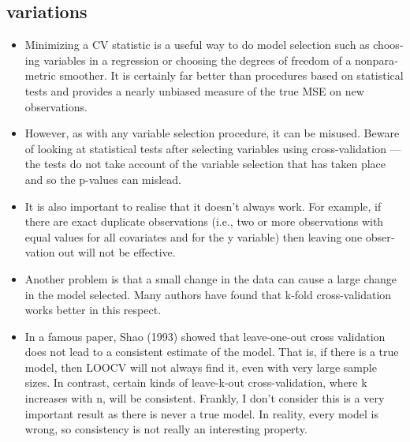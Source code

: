 \documentclass[a4paper,12pt]{article}
\begin{document}
\subsection{variations}

\begin{itemize}
	\item Min­i­miz­ing a CV sta­tis­tic is a use­ful way to do model selec­tion such as choos­ing vari­ables in a regres­sion or choos­ing the degrees of free­dom of a non­para­met­ric smoother. It is cer­tainly far bet­ter than pro­ce­dures based on sta­tis­ti­cal tests and pro­vides a nearly unbi­ased mea­sure of the true MSE on new observations.
	
\item How­ever, as with any vari­able selec­tion pro­ce­dure, it can be mis­used. Beware of look­ing at sta­tis­ti­cal tests after select­ing vari­ables using cross-​​validation — the tests do not take account of the vari­able selec­tion that has taken place and so the p-​​values can mislead.
	
\item It is also impor­tant to realise that it doesn’t always work. For exam­ple, if there are exact dupli­cate obser­va­tions (i.e., two or more obser­va­tions with equal val­ues for all covari­ates and for the y vari­able) then leav­ing one obser­va­tion out will not be effective.
	
\item Another prob­lem is that a small change in the data can cause a large change in the model selected. Many authors have found that k-​​fold cross-​​validation works bet­ter in this respect.
\item In a famous paper, Shao (1993) showed that leave-​​one-​​out cross val­i­da­tion does not lead to a con­sis­tent esti­mate of the model. That is, if there is a true model, then LOOCV will not always find it, even with very large sam­ple sizes. In con­trast, cer­tain kinds of leave-​​k-​​out cross-​​validation, where k increases with n, will be con­sis­tent. Frankly, I don’t con­sider this is a very impor­tant result as there is never a true model. In real­ity, every model is wrong, so con­sis­tency is not really an inter­est­ing property.
\end{itemize}
\end{document}
